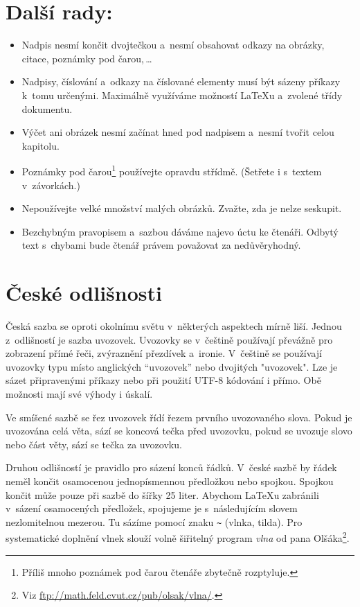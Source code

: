 \documentclass[a4paper, 10pt, twocolumn]{article}[26.02.2012]
\begin{document}
\section{Další rady:}\label{rady}
\begin{itemize}
  \item Nadpis nesmí končit dvojtečkou a~nesmí obsahovat odkazy na obrázky, citace, poznámky pod čarou,\,\dots
  \item Nadpisy, číslování a~odkazy na číslované elementy mu\-sí být sázeny příkazy k~tomu
určenými. Maximálně využíváme možností \LaTeX u a~zvolené třídy dokumen\-tu.
  \item Výčet ani obrázek nesmí začínat hned pod nadpisem a~nesmí tvořit celou kapitolu.
  \item Poznámky pod čarou\footnote{Příliš mnoho poznámek pod čarou čtenáře zbytečně rozptyluje.}
používejte opravdu střídmě. (Šetřete i s~textem v~závorkách.)
  \item Nepoužívejte velké množství malých obrázků. Zvažte, zda je nelze seskupit.
  \item Bezchybným pravopisem a~sazbou dáváme najevo úctu ke čtenáři. Odbytý
text s~chybami bude čtenář právem považovat za nedůvěryhodný.
\end{itemize}
\section{České odlišnosti}\label{ceske}
Česká sazba se oproti okolnímu světu v~některých aspektech mírně liší. Jednou
z~odlišností je sazba uvozovek. Uvozovky se v~češtině používají převážně pro zobrazení
přímé řeči, zvýraznění přezdívek a~ironie. V~češtině se používají uvozovky typu
 místo anglických ``uvozovek'' nebo dvojitých "uvozovek". Lze je sázet
připravenými příkazy nebo při použití UTF-8 kódování i přímo. Obě možnosti mají své
výhody i úskalí.

Ve smíšené sazbě se řez uvozovek řídí řezem prvního uvozovaného slova. Pokud je
uvozována celá věta, sází se koncová tečka před uvozovku, pokud se uvozuje slovo
nebo část věty, sází se tečka za uvozovku.

Druhou odlišností je pravidlo pro sázení konců řádků. V~české sazbě by řádek neměl
končit osamocenou jednopísmennou předložkou nebo spojkou. Spojkou  končit může
pouze při sazbě do šířky 25 liter. Abychom \LaTeX u zabránili v~sázení osamocených
předložek, spojujeme je s~následujícím slovem nezlomitelnou mezerou. Tu sázíme pomocí
znaku \verb|~| (vlnka, tilda). Pro systematické doplnění vlnek slouží volně šiřitelný
program \emph{vlna} od pana Olšáka\footnote{Viz \url{ftp://math.feld.cvut.cz/pub/olsak/vlna/}.}.
\end{document}
